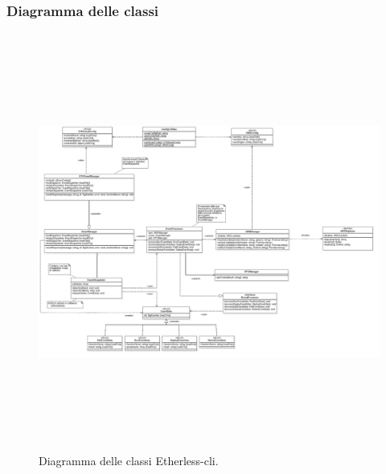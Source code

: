 \restoregeometry
{}
\begin{landscape}
\subsubsection{Diagramma delle classi}
	\begin{figure}[H]
		\includegraphics[width=23cm, height=13.7cm]{././diagrammi/etherless-server/Etherless-server-classi.png}
		\caption{Diagramma delle classi Etherless-cli.}
	\end{figure}
\end{landscape}
\restoregeometry
